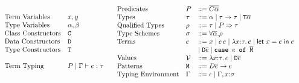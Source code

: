 \documentclass[format=sigplan,manuscript,review,screen,nonacm,margin=1in]{acmart}
\begin{document}
\begin{figure}[ht]
  \[
  \begin{array}{l l l}
    &\text{Term Variables}     &x, y\\
    &\text{Type Variables}     &\alpha, \beta\\
    &\text{Class Constructors} &\texttt{C}\\
    &\text{Data Constructors}  &\texttt{D}\\
    &\text{Type Constructors}  &\texttt{T}\\
    \\
    &\text{Term Typing}        &P \mid \Gamma \vdash e : \tau

  \end{array}
  \begin{array}{l l l l}
    &\text{Predicates}      &P &\mathrel{{:}{:}{=}} \overline{C\overline{\alpha}}\\
    &\text{Types}           &\tau   &\mathrel{{:}{:}{=}} \alpha \mathrel{\mid} \tau\to\tau \mathrel{\mid} \texttt{T}\overline{\alpha}\\
    &\text{Qualified Types} &\rho   &\mathrel{{:}{:}{=}} \tau \mathrel{\mid} P\Rightarrow\tau\\
    &\text{Type Schemes}    &\sigma &\mathrel{{:}{:}{=}} \forall{\overline{\alpha}}.\rho\\
    &\text{Terms}           &e    &\mathrel{{:}{:}{=}} x \mathrel{\mid} e\, e \mathrel{\mid} \lambda x{:}\tau.\, e \mathrel{\mid} \mathsf{let}\;x = e\;\mathsf{in}\;e\\
    &                       &       &\mathrel{\mid} \texttt{D}\overline{e} \mathrel{\mid} \texttt{\textbf{case }} e \texttt{\textbf{ of }} \overline{\texttt{M}}\\
    &\text{Values}          &\mathcal{V}   &\mathrel{{:}{:}{=}} \lambda x{:}\tau.\, e \mathrel{\mid} \texttt{D}\overline{e}\\
    &\text{Patterns}        &\texttt{M} &\mathrel{{:}{:}{=}} D\overline{e} \to e\\
    &\text{Typing Environment} &\Gamma &\mathrel{{:}{:}{=}} \epsilon \mathrel{\mid} \Gamma,x{:}\sigma
  \end{array}
  \]
  \caption{\TCFD}
  \label{fig:ty-fd-formal}
\end{figure}
\end{document}
